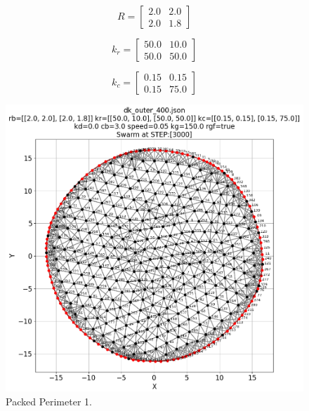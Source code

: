 \documentclass[12pt,a4paper]{IEEEtran}
\newcommand{\kc}{\mathit{k_c}}
\newcommand{\kr}{\mathit{k_r}}
\newcommand{\rb}{\mathit{R}}
\begin{document}
\begin{equation}\label{eq:rbexp1}
\rb = 
\begin{bmatrix}
2.0 & 2.0\\
2.0 & 1.8
\end{bmatrix}
\end{equation}

\begin{equation}\label{eq:krexp1}
\kr = 
\begin{bmatrix}
50.0 & 10.0\\
50.0 & 50.0
\end{bmatrix}
\end{equation}

\begin{equation}\label{eq:kcexp1}
\kc = 
\begin{bmatrix}
0.15 & 0.15\\
0.15 & 75.0
\end{bmatrix}
\end{equation}

\begin{figure}[H]
	\begin{center}
		\includegraphics[width=1.0\linewidth]{figures/outer1}
	\end{center}
	\caption{Packed Perimeter 1. \label{fig:tightPerim}}
\end{figure}
\end{document}
